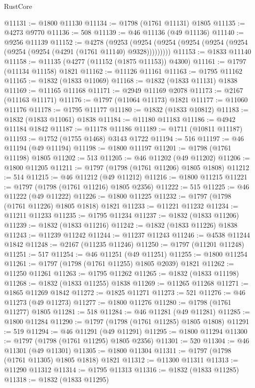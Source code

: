 \begin{lexlean}{RustCore}
\begin{coremodule}
@11131 := @1800 @11130
@11134 := @1798 (@1761 @11131) @1805
@11135 := @4273 @9770
@11136 := 508
@11139 := @46 @11136 (@49 @11136)
@11140 := @9256 @11139
@11152 := @4278
    (@9253 (@9254 (@9254 (@9254 (@9254 (@9254 (@9254 (@9254 (@4291 (@1761 @11140) @9328)))))))))
@11153 := @1833 @11140
@11158 := @11135 (@4277 (@11152 (@1875 @11153)) @4300)
@11161 := @1797 (@11134 @11158) @1821
@11162 := @11126 @11161
@11163 := @1795 @11162
@11165 := @1832 (@1833 @11069)
@11168 := @1832 (@1833 @11131) @1838
@11169 := @11165 @11168
@11171 := @2949 @11169 @2078
@11173 := @2167 (@11163 @11171)
@11176 := @1797 (@11064 @11173) @1821
@11177 := @11060 @11176
@11178 := @1795 @11177
@11180 := @1832 (@1833 @10812)
@11183 := @1832 (@1833 @11061) @1838
@11184 := @11180 @11183
@11186 := @4942 @11184 @1842
@11187 := @11178 @11186
@11189 := @1711 (@10811 @11187)
@11193 := @1752 (@1755 @1468) @3143 @1722
@11194 := 516
@11197 := @46 @11194 (@49 @11194)
@11198 := @1800 @11197
@11201 := @1798 (@1761 @11198) @1805
@11202 := 513
@11205 := @46 @11202 (@49 @11202)
@11206 := @1800 @11205
@11211 := @1797 (@1798 (@1761 @11206) @1805 @1808)
@11212 := 514
@11215 := @46 @11212 (@49 @11212)
@11216 := @1800 @11215
@11221 := @1797 (@1798 (@1761 @11216) @1805 @2356)
@11222 := 515
@11225 := @46 @11222 (@49 @11222)
@11226 := @1800 @11225
@11232 := @1797 (@1798 (@1761 @11226) @1805 @1818) @1821
@11233 := @11221 @11232
@11234 := @11211 @11233
@11235 := @1795 @11234
@11237 := @1832 (@1833 @11206)
@11239 := @1832 (@1833 @11216)
@11242 := @1832 (@1833 @11226) @1838
@11243 := @11239 @11242
@11244 := @11237 @11243
@11246 := @4538 @11244 @1842
@11248 := @2167 (@11235 @11246)
@11250 := @1797 (@11201 @11248)
@11251 := 517
@11254 := @46 @11251 (@49 @11251)
@11255 := @1800 @11254
@11261 := @1797 (@1798 (@1761 @11255) @1805 @2039) @1821
@11262 := @11250 @11261
@11263 := @1795 @11262
@11265 := @1832 (@1833 @11198)
@11268 := @1832 (@1833 @11255) @1838
@11269 := @11265 @11268
@11271 := @1865 @11269 @1842
@11272 := @1825 @11271
@11273 := 521
@11276 := @46 @11273 (@49 @11273)
@11277 := @1800 @11276
@11280 := @1798 (@1761 @11277) @1805
@11281 := 518
@11284 := @46 @11281 (@49 @11281)
@11285 := @1800 @11284
@11290 := @1797 (@1798 (@1761 @11285) @1805 @1808)
@11291 := 519
@11294 := @46 @11291 (@49 @11291)
@11295 := @1800 @11294
@11300 := @1797 (@1798 (@1761 @11295) @1805 @2356)
@11301 := 520
@11304 := @46 @11301 (@49 @11301)
@11305 := @1800 @11304
@11311 := @1797 (@1798 (@1761 @11305) @1805 @1818) @1821
@11312 := @11300 @11311
@11313 := @11290 @11312
@11314 := @1795 @11313
@11316 := @1832 (@1833 @11285)
@11318 := @1832 (@1833 @11295)

\end{coremodule}
\end{lexlean}
